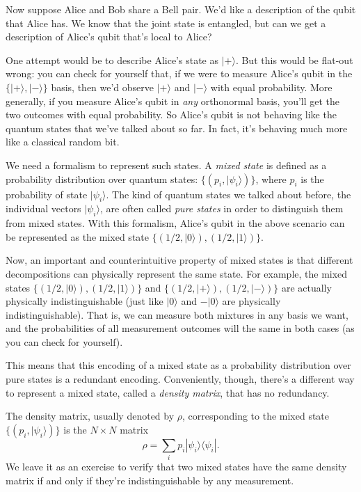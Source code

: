 \documentclass[11pt]{report}
\theoremstyle{plain}
\theoremstyle{definition}
\renewcommand{\ket}[1]{|#1\rangle}
\newcommand{\ketbra}[2]{|#1\rangle\!\langle#2|}
\begin{document}
Now suppose Alice and Bob share a Bell pair. We'd like a description of the qubit that Alice has. We know that the joint state is entangled, but can we get a description of Alice's qubit that's local to Alice?

One attempt would be to describe Alice's state as $\ket{+}$. But this would be flat-out wrong: you can check for yourself that, if we were to measure Alice's qubit in the $\{\ket{+}, \ket{-}\}$ basis, then we'd observe $\ket{+}$ and $\ket{-}$ with equal probability. More generally, if you measure Alice's qubit in \emph{any} orthonormal basis, you'll get the two outcomes with equal probability. So Alice's qubit is not behaving like the quantum states that we've talked about so far. In fact, it's behaving much more like a classical random bit.

We need a formalism to represent such states. A \emph{mixed state} is defined as a probability distribution over quantum states: $\{(p_i, \ket{\psi_i})\}$, where $p_i$ is the probability of state $\ket{\psi_i}$. The kind of quantum states we talked about before, the individual vectors $\ket{\psi_i}$, are often called \emph{pure states} in order to distinguish them from mixed states. With this formalism, Alice's qubit in the above scenario can be represented as the mixed state $\{(1/2, \ket{0}), (1/2, \ket{1})\}$.

Now, an important and counterintuitive property of mixed states is that different decompositions can physically represent the same state. For example, the mixed states $\{(1/2, \ket{0}), (1/2, \ket{1})\}$ and $\{(1/2, \ket{+}), (1/2, \ket{-})\}$ are actually physically indistinguishable (just like $\ket{0}$ and $-\ket{0}$ are physically indistinguishable).  That is, we can measure both mixtures in any basis we want, and the probabilities of all measurement outcomes will the same in both cases (as you can check for yourself).

This means that this encoding of a mixed state as a probability distribution over pure states is a redundant encoding.  Conveniently, though, there's a different way to represent a mixed state, called a \emph{density matrix}, that has no redundancy.

The density matrix, usually denoted by $\rho$, corresponding to the mixed state $\{(p_i, \ket{\psi_i})\}$ is the $N\times N$ matrix
\[
\rho = \sum_i p_i \ketbra{\psi_i}{\psi_i}.
\]
We leave it as an exercise to verify that two mixed states have the same density matrix if and only if they're indistinguishable by any measurement.
\end{document}
